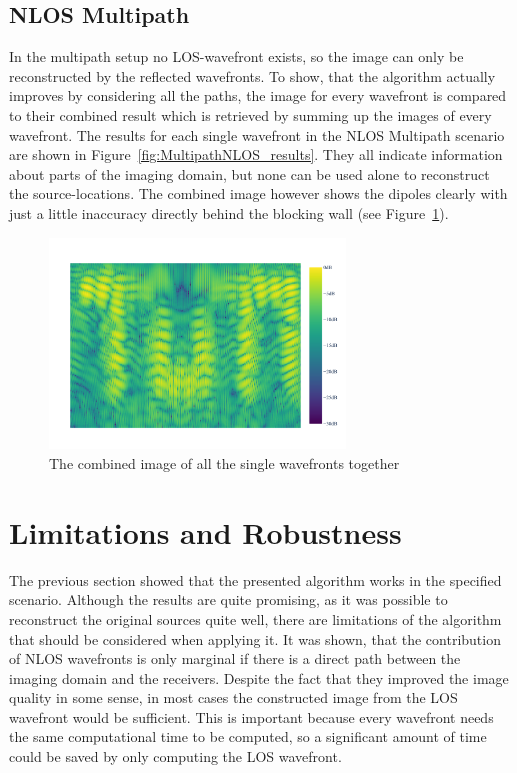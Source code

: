 \subsection{NLOS Multipath}
In the multipath setup no LOS-wavefront exists, so the image can only be reconstructed by the reflected wavefronts.
To show, that the algorithm actually improves by considering all the paths, the image for every wavefront is compared to their combined result which is retrieved by summing up the images of every wavefront.
The results for each single wavefront in the NLOS Multipath scenario are shown in Figure~\ref{fig:MultipathNLOS_results}.
They all indicate information about parts of the imaging domain, but none can be used alone to reconstruct the source-locations.
The combined image however shows the dipoles clearly with just a little inaccuracy directly behind the blocking wall (see Figure~\ref{fig:MultipathNLOS_combined}).

\begin{figure}[hp]
    \centering
    \includegraphics[page=1, width=0.7\textwidth]{figures/multipath_nlos_combined.pdf}
    \caption{The combined image of all the single wavefronts together}\label{fig:MultipathNLOS_combined}
\end{figure}

\section{Limitations and Robustness}
The previous section showed that the presented algorithm works in the specified scenario.
Although the results are quite promising, as it was possible to reconstruct the original sources quite well, there are limitations of the algorithm that should be considered when applying it.
It was shown, that the contribution of NLOS wavefronts is only marginal if there is a direct path between the imaging domain and the receivers.
Despite the fact that they improved the image quality in some sense, in most cases the constructed image from the LOS wavefront would be sufficient.
This is important because every wavefront needs the same computational time to be computed, so a significant amount of time could be saved by only computing the LOS wavefront.

